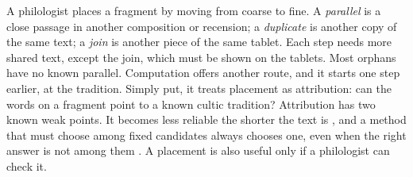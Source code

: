\documentclass[11pt]{article}
\newcommand{\term}[1]{\textit{#1}}
\begin{document}
A philologist places a fragment by moving from coarse to fine. A \term{parallel} is a close
passage in another composition or recension; a \term{duplicate} is another copy of the same text;
a \term{join} is another piece of the same tablet. Each step needs more shared text, except the
join, which must be shown on the tablets. Most orphans have no known parallel. Computation offers
another route, and it starts one step earlier, at the tradition. Simply put, it treats
placement as attribution: can the words on a fragment point to a known cultic tradition? Attribution has two
known weak points. It becomes less reliable the shorter the text is \citep{eder2015size}, and a
method that must choose among fixed candidates always chooses one, even when the right answer is
not among them \citep{koppel2011wild}. A placement is also useful only if a philologist can check
it.
\end{document}
